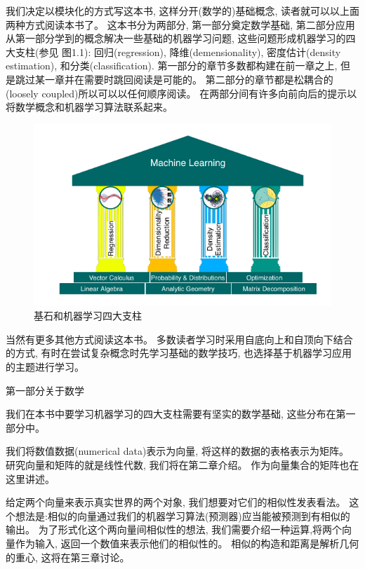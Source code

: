 我们决定以模块化的方式写这本书, 这样分开(数学的)基础概念, 读者就可以以上面两种方式阅读本书了。
这本书分为两部分, 第一部分奠定数学基础, 第二部分应用从第一部分学到的概念解决一些基础的机器学习问题,
这些问题形成机器学习的四大支柱(参见 图1.1):
回归(regression), 降维(demensionality), 密度估计(density estimation), 和分类(classification).
第一部分的章节多数都构建在前一章之上, 但是跳过某一章并在需要时跳回阅读是可能的。
第二部分的章节都是松耦合的(loosely coupled)所以可以以任何顺序阅读。
在两部分间有许多向前向后的提示以将数学概念和机器学习算法联系起来。

\begin{figure}
	\includegraphics[width=\textwidth]{./chapter01/pillar.png}
	\caption{基石和机器学习四大支柱}
\end{figure}

当然有更多其他方式阅读这本书。
多数读者学习时采用自底向上和自顶向下结合的方式,
有时在尝试复杂概念时先学习基础的数学技巧,
也选择基于机器学习应用的主题进行学习。

\begin{center} 第一部分关于数学 \end{center}
我们在本书中要学习机器学习的四大支柱需要有坚实的数学基础, 这些分布在第一部分中。

我们将数值数据(numerical data)表示为向量, 将这样的数据的表格表示为矩阵。
研究向量和矩阵的就是线性代数, 我们将在第二章介绍。
作为向量集合的矩阵也在这里讲述。

给定两个向量来表示真实世界的两个对象, 我们想要对它们的相似性发表看法。
这个想法是:相似的向量通过我们的机器学习算法(预测器)应当能被预测到有相似的输出。
为了形式化这个两向量间相似性的想法, 我们需要介绍一种运算,将两个向量作为输入, 返回一个数值来表示他们的相似性的。
相似的构造和距离是解析几何的重心, 这将在第三章讨论。

